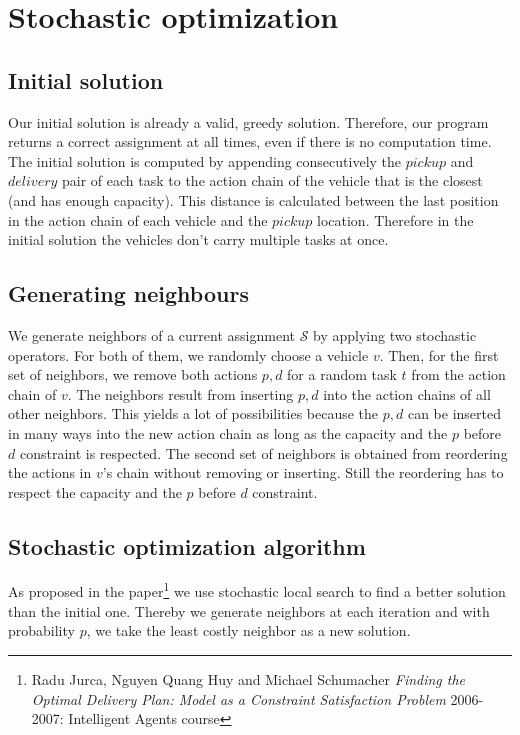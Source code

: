 \documentclass[11pt]{article}
\begin{document}
\section{Stochastic optimization}

\subsection{Initial solution}

Our initial solution is already a valid, greedy solution. Therefore, our program
returns a correct assignment at all times, even if there is no computation time.
The initial solution is computed by appending consecutively the $pickup$ and
$delivery$ pair of each task to the action chain of the vehicle that is the
closest (and has enough capacity). This distance is calculated between the last
position in the action chain of each vehicle and the $pickup$ location.
Therefore in the initial solution the vehicles don't carry multiple tasks at
once.


\subsection{Generating neighbours}

We generate neighbors of a current assignment $\mathcal{S}$ by applying two
stochastic operators. For both of them, we randomly choose a vehicle $v$. Then,
for the first set of neighbors, we remove both actions $p, d$ for a random task
$t$ from the action chain of $v$. The neighbors result from inserting $p, d$
into the action chains of all other neighbors. This yields a lot of
possibilities because the $p, d$ can be inserted in many ways into the new
action chain as long as the capacity and the $p$ before $d$ constraint is
respected. The second set of neighbors is obtained from reordering the actions
in $v$'s chain without removing or inserting. Still the reordering has to
respect the capacity and the $p$ before $d$ constraint.


\subsection{Stochastic optimization algorithm}

As proposed in the paper\footnote{Radu Jurca, Nguyen Quang Huy and Michael
Schumacher {\em Finding the Optimal Delivery Plan: Model as a Constraint
Satisfaction Problem} 2006-2007: Intelligent Agents course} we use stochastic
local search to find a better solution than the initial one. Thereby we generate
neighbors at each iteration and with probability $p$, we take the least costly
neighbor as a new solution.
\end{document}

